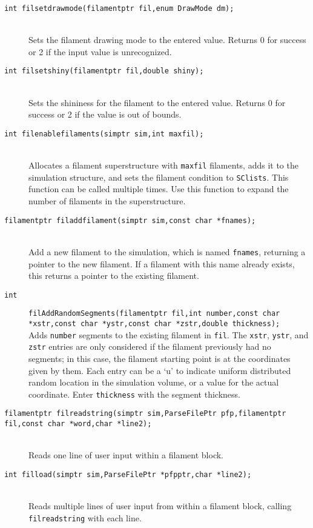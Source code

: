 \documentclass {scrbook}
\newcommand {\ttt} {\texttt}
\begin{document}
\begin{description}
\item[\ttt{int filsetdrawmode(filamentptr fil,enum DrawMode dm);}]
\hfill \\
Sets the filament drawing mode to the entered value. Returns 0 for success or 2 if the input value is unrecognized.

\item[\ttt{int filsetshiny(filamentptr fil,double shiny);}]
\hfill \\
Sets the shininess for the filament to the entered value. Returns 0 for success or 2 if the value is out of bounds.

\item[\ttt{int filenablefilaments(simptr sim,int maxfil);}]
\hfill \\
Allocates a filament superstructure with \ttt{maxfil} filaments, adds it to the simulation structure, and sets the filament condition to \ttt{SClists}. This function can be called multiple times. Use this function to expand the number of filaments in the superstructure.

\item[\ttt{filamentptr filaddfilament(simptr sim,const char *fnames);}]
\hfill \\
Add a new filament to the simulation, which is named \ttt{fnames}, returning a pointer to the new filament. If a filament with this name already exists, this returns a pointer to the existing filament.

\item[\ttt{int}]
\ttt{filAddRandomSegments(filamentptr fil,int number,const char *xstr,const char *ystr,const char *zstr,double thickness);}
\hfill \\
Adds \ttt{number} segments to the existing filament in \ttt{fil}. The \ttt{xstr}, \ttt{ystr}, and \ttt{zstr} entries are only considered if the filament previously had no segments; in this case, the filament starting point is at the coordinates given by them. Each entry can be a `u' to indicate uniform distributed random location in the simulation volume, or a value for the actual coordinate. Enter \ttt{thickness} with the segment thickness.

\item[\ttt{filamentptr filreadstring(simptr sim,ParseFilePtr pfp,filamentptr fil,const char *word,char *line2);}]
\hfill \\
Reads one line of user input within a filament block.

\item[\ttt{int filload(simptr sim,ParseFilePtr *pfpptr,char *line2);}]
\hfill \\
Reads multiple lines of user input from within a filament block, calling \ttt{filreadstring} with each line.


\end{description}
\end{document}
